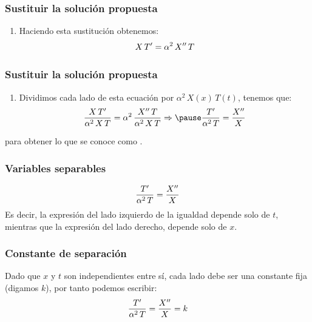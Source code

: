\documentclass[12pt]{beamer}
\begin{document}
\begin{frame}
\frametitle{Sustituir la solución propuesta}
\begin{enumerate}
\conti
\item Haciendo esta sustitución obtenemos:
\begin{eqnarray*}
\begin{aligned}
X \, {T}^{\prime} = \alpha^{2} \, {X}^{\prime \prime} \, T
\end{aligned}
\end{eqnarray*}
\seti
\end{enumerate}
\end{frame}
\begin{frame}
\frametitle{Sustituir la solución propuesta}
\begin{enumerate}
\conti
\item Dividimos cada lado de esta ecuación por $\alpha^{2} \, X(x) \, T(t)$, tenemos que:
\begin{eqnarray*}
\begin{aligned}
\dfrac{X \, \pderivada{T}}{\alpha^{2} \, X \, T} = \alpha^{2} \, \dfrac{\sderivada{X} \, T}{ \alpha^{2} \, X \, T} \Rightarrow \pause \dfrac{\pderivada{T}}{\alpha^{2} \, T} = \dfrac{\sderivada{X}}{X}
\end{aligned}
\end{eqnarray*}
\end{enumerate}
\pause
para obtener lo que se conoce como .
\end{frame}
\begin{frame}
\frametitle{Variables separables}
\begin{align*}
\dfrac{{T}^{\prime}}{\alpha^{2} \, T} = \dfrac{{X}^{\prime \prime}}{X}
\end{align*}
Es decir, la expresión del lado izquierdo de la igualdad depende solo de $t$, mientras que la expresión del lado derecho, depende solo de $x$.
\end{frame}
\begin{frame}
\frametitle{Constante de separación}
Dado que $x$ y $t$ son independientes entre sí, cada lado debe ser una constante fija (digamos $k$),  por tanto podemos escribir:
\pause
\begin{align*}
\dfrac{{T}^{\prime}}{\alpha^{2} \, T} = \dfrac{{X}^{\prime \prime}}{X} = k
\end{align*}
\end{frame}
\end{document}
